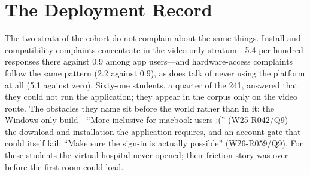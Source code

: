 
\section{The Deployment Record}


The two strata of the cohort do not complain about the same things. Install
and compatibility complaints concentrate in the video-only stratum---5.4 per
hundred responses there against 0.9 among app users---and hardware-access
complaints follow the same pattern (2.2 against 0.9), as does talk of never
using the platform at all (5.1 against zero). Sixty-one students, a quarter
of the 241, answered that they could not run the application; they appear in
the corpus only on the video route. The obstacles they name sit before the
world rather than in it: the Windows-only build---``More inclusive for
macbook users :('' (W25-R042/Q9)---the download and installation the
application requires, and an account gate that could itself fail: ``Make sure
the sign-in is actually possible'' (W26-R059/Q9). For these students the
virtual hospital never opened; their friction story was over before the
first room could load.

